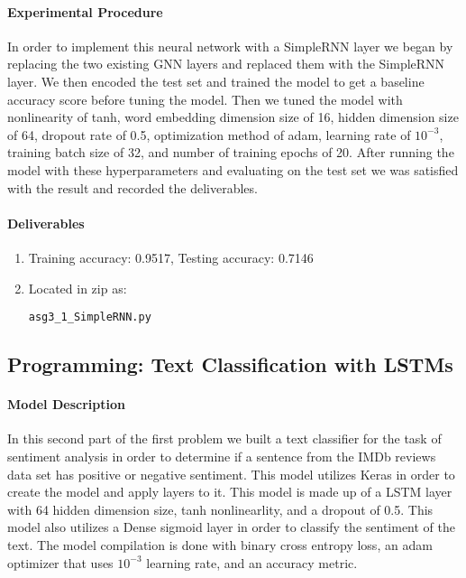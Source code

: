 \documentclass[11pt,letterpaper]{article}
\begin{document}
\paragraph{Experimental Procedure} In order to implement this neural network with a SimpleRNN layer we began by replacing the two existing GNN layers and replaced them with the SimpleRNN layer. We then encoded the test set and trained the model to get a baseline accuracy score before tuning the model. Then we tuned the model with nonlinearity of tanh, word embedding dimension size of 16, hidden dimension size of 64, dropout rate of 0.5, optimization method of adam, learning rate of $10^{-3}$, training batch size of 32, and number of training epochs of 20. After running the model with these hyperparameters and evaluating on the test set we was satisfied with the result and recorded the deliverables. 

\paragraph{Deliverables} 
\begin{enumerate}
	\item Training accuracy: 0.9517, Testing accuracy: 0.7146
	\item Located in zip as: \begin{verbatim}asg3_1_SimpleRNN.py
	\end{verbatim}
\end{enumerate}

\subsection{Programming: Text Classification with LSTMs}

\paragraph{Model Description}
In this second part of the first problem we built a text classifier for the task of sentiment analysis in order to determine if a sentence from the IMDb reviews data set has positive or negative sentiment. This model utilizes Keras in order to create the model and apply layers to it. This model is made up of a LSTM layer with 64 hidden dimension size, tanh nonlinearlity, and a dropout of 0.5. This model also utilizes a Dense sigmoid layer in order to classify the sentiment of the text. The model compilation is done with binary cross entropy loss, an adam optimizer that uses $10^{-3}$ learning rate, and an accuracy metric.
\end{document}
